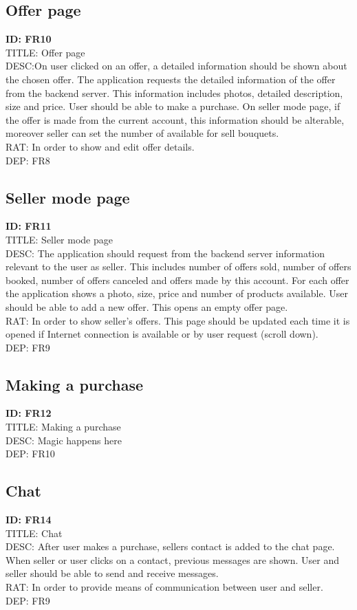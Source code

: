 \documentclass{scrreprt}
\begin{document}
\subsection{Offer page}
\textbf{ID: FR10}\\
TITLE: Offer page\\
DESC:On user clicked on an offer, a detailed information should be shown about the chosen offer. The application requests the detailed information of the offer from the backend server. This information includes photos, detailed description, size and price. User should be able to make a purchase. On seller mode page, if the offer is made from the current account, this information should be alterable, moreover seller can set the number of available for sell bouquets.\\
RAT: In order to show and edit offer details.\\
DEP: FR8

\subsection{Seller mode page}
\textbf{ID: FR11}\\
TITLE: Seller mode page\\
DESC: The application should request from the backend server information relevant to the user as seller. This includes number of offers sold, number of offers booked, number of offers canceled and offers made by this account. For each offer the application shows a photo, size, price and number of products available. User should be able to add a new offer. This opens an empty offer page.\\
RAT: In order to show seller's offers. This page should be updated each time it is opened if Internet connection is available or by user request (scroll down).\\
DEP: FR9

\subsection{Making a purchase}
\textbf{ID: FR12}\\
TITLE: Making a purchase\\
DESC: Magic happens here\\
DEP: FR10

\subsection{Chat}
\textbf{ID: FR14}\\
TITLE: Chat\\
DESC: After user makes a purchase, sellers contact is added to the chat page. When seller or user clicks on a contact, previous messages are shown. User and seller should be able to send and receive messages.\\
RAT: In order to provide means of communication between user and seller.\\
DEP: FR9
\end{document}
